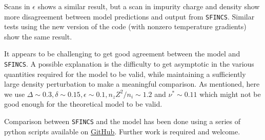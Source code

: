 \documentclass[12pt]{article}
\begin{document}
Scans in $\epsilon$ shows a similar result, but a scan in impurity charge and density show more disagreement between model predictions and output from \texttt{SFINCS}. Similar tests using the new version of the code (with nonzero temperature gradients) show the same result. 

It appears to be challenging to get good agreement between the model and \texttt{SFINCS}. A possible explanation is the difficulty to get asymptotic in the various quantities required for the model to be valid, while maintaining a sufficiently large density perturbation to make a meaningful comparison. As mentioned, here we use $\Delta\sim 0.3, \delta \sim 0.15, \epsilon \sim 0.1, n_zZ^2/n_i \sim 1.2$ and $\nu^*\sim 0.11$ which might not be good enough for the theoretical model to be valid. 

Comparison between \texttt{SFINCS} and the model has been done using a series of python scripts available on \href{https://github.com/landreman/sfincs/commit/520091f6b9ed06cf0b7b1caaa7e0fcfc477f906f}{GitHub}. Further work is required and welcome. 










 
\end{document}

